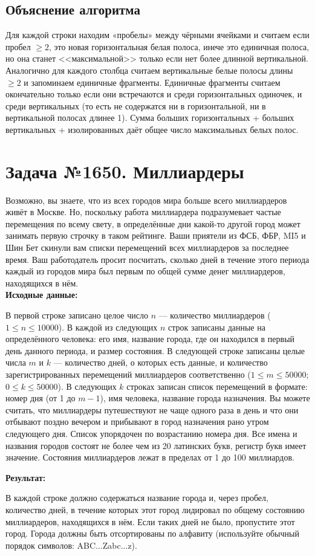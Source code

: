 \documentclass[a4paper,12pt]{article}
\begin{document}
\subsection*{Объяснение алгоритма}
Для каждой строки находим «пробелы» между чёрными ячейками и считаем если пробел $\geq 2$, это новая горизонтальная белая полоса, инече это единичная полоса, но она станет <<максимальной>> только если нет более длинной вертикальной. Аналогично для каждого столбца считаем вертикальные белые полосы длины $\geq 2$ и запоминаем единичные фрагменты. Единичные фрагменты считаем окончательно только если они встречаются и среди горизонтальных одиночек, и среди вертикальных (то есть не содержатся ни в горизонтальной, ни в вертикальной полосах длинее 1). Сумма больших горизонтальных + больших вертикальных + изолированных даёт общее число максимальных белых полос.

\newpage
\section*{Задача №1650. Миллиардеры}
Возможно, вы знаете, что из всех городов мира больше всего миллиардеров живёт в Москве. Но, поскольку работа миллиардера подразумевает частые перемещения по всему свету, в определённые дни какой-то другой город может занимать первую строчку в таком рейтинге. Ваши приятели из ФСБ, ФБР, MI5 и Шин Бет скинули вам списки перемещений всех миллиардеров за последнее время. Ваш работодатель просит посчитать, сколько дней в течение этого периода каждый из городов мира был первым по общей сумме денег миллиардеров, находящихся в нём.\\[1em]
\textbf{Исходные данные:}
\begin{quotebox}
    В первой строке записано целое число $n$ — количество миллиардеров ($1 \leq n \leq 10000$). В каждой из следующих $n$ строк записаны данные на определённого человека: его имя, название города, где он находился в первый день данного периода, и размер состояния. В следующей строке записаны целые числа $m$ и $k$ — количество дней, о которых есть данные, и количество зарегистрированных перемещений миллиардеров соответственно ($1 \leq m \leq 50000$; $0 \leq k \leq 50000$). В следующих $k$ строках записан список перемещений в формате: номер дня (от 1 до $m - 1$), имя человека, название города назначения. Вы можете считать, что миллиардеры путешествуют не чаще одного раза в день и что они отбывают поздно вечером и прибывают в город назначения рано утром следующего дня. Список упорядочен по возрастанию номера дня. Все имена и названия городов состоят не более чем из 20 латинских букв, регистр букв имеет значение. Состояния миллиардеров лежат в пределах от 1 до 100 миллиардов.
\end{quotebox}
\textbf{Результат:}
\begin{quotebox}
    В каждой строке должно содержаться название города и, через пробел, количество дней, в течение которых этот город лидировал по общему состоянию миллиардеров, находящихся в нём. Если таких дней не было, пропустите этот город. Города должны быть отсортированы по алфавиту (используйте обычный порядок символов: ABC...Zabc...z).
\end{quotebox}
\end{document}
